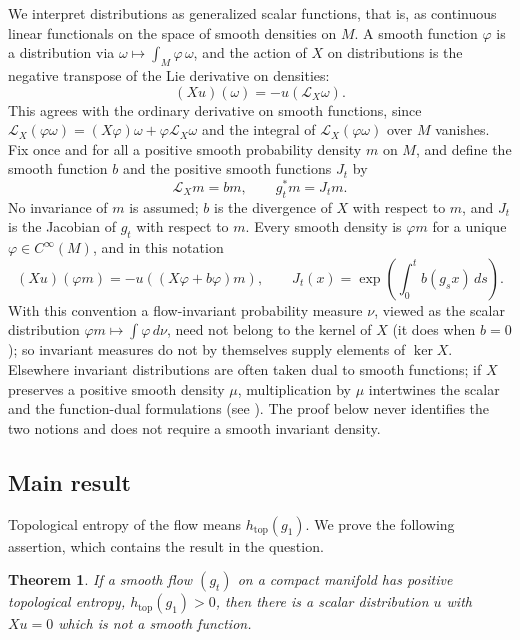 \documentclass[12pt]{article}
\newtheorem{theorem}{Theorem}[section]
\theoremstyle{remark}
\newcommand{\LX}{\mathcal L_X}
\newcommand{\htop}{h_{\mathrm{top}}}
\begin{document}
We interpret distributions as generalized scalar functions, that is,
as continuous linear functionals on the space of smooth densities on
\(M\).  A smooth function \(\varphi\) is a distribution via
\(\omega\mapsto\int_M\varphi\,\omega\), and the action of \(X\) on
distributions is the negative transpose of the Lie derivative on
densities:
\[
 (Xu)(\omega)=-u(\mathcal L_X\omega).
\]
This agrees with the ordinary derivative on smooth functions, since
\(\LX(\varphi\omega)=(X\varphi)\omega+\varphi\LX\omega\) and the
integral of \(\LX(\varphi\omega)\) over \(M\) vanishes.
Fix once and for all a positive smooth probability density \(m\) on
\(M\), and define the smooth function \(b\) and the positive smooth
functions \(J_t\) by
\[
 \mathcal L_Xm=bm,\qquad g_t^*m=J_tm .
\]
No invariance of \(m\) is assumed; \(b\) is the divergence of \(X\)
with respect to \(m\), and \(J_t\) is the Jacobian of \(g_t\)
with respect to \(m\).  Every smooth density is \(\varphi m\) for a
unique \(\varphi\in C^\infty(M)\), and in this notation
\begin{equation}\label{eq:scalar}
 (Xu)(\varphi m)=-u((X\varphi+b\varphi)m),\qquad
 J_t(x)=\exp\!\left(\int_0^t b(g_sx)\,ds\right).
\end{equation}
With this convention a flow-invariant probability measure \(\nu\),
viewed as the scalar distribution \(\varphi m\mapsto\int\varphi\,d\nu\),
need not belong to the kernel of \(X\) (it does when \(b=0\)); so
invariant measures do not by themselves supply elements of
\(\ker X\).
Elsewhere invariant distributions are often taken dual to smooth
functions; if \(X\) preserves a positive smooth density \(\mu\),
multiplication by \(\mu\) intertwines the scalar and the
function-dual formulations (see \cite[Section~3]{Forni2008}).  The
proof below never identifies the two notions and does not require a
smooth invariant density.

\subsection{Main result}

Topological entropy of the flow means \(\htop(g_1)\).
We prove the following assertion, which contains the result in the
question.

\begin{theorem}\label{thm:obstruction}
If a smooth flow \((g_t)\) on a compact manifold has positive
topological entropy, \(\htop(g_1)>0\), then there is a scalar
distribution \(u\) with \(Xu=0\) which is not a smooth function.
\end{theorem}
\end{document}
